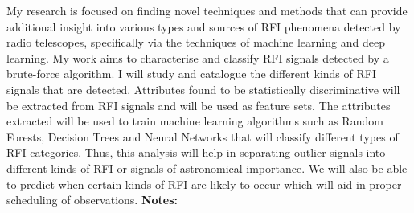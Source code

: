 \documentclass{report}
\begin{document}
{{{{{{{{{{{{{{{{{{{{{{{{{{{{{{{{{{{{{{{{{{{{{{{{{{{{{{{{{{{{{{{{{{{{{{{{{{{{{{{{{{{{{{{{{{{{{{{{{{{{{{{{{{{{{{{{{{{{{{{{{{{{{{{{{{{{{{{{{{{{{{{{{{{{{{{{{{{{{{{{{{{{{{{{{{{{{{{My research is focused on finding novel techniques and methods that can provide additional insight into various types and sources of RFI phenomena detected by radio telescopes, specifically via the techniques of machine learning and deep learning. My work aims to characterise and classify RFI signals detected by a brute-force algorithm. I will study and catalogue the different kinds of RFI signals that are detected. Attributes found to be statistically discriminative will be extracted from RFI signals and will be used as feature sets. The attributes extracted will be used to train machine learning algorithms such as Random Forests, Decision Trees and Neural Networks that will classify different types of RFI categories. Thus,
this analysis will help in separating outlier signals into different kinds of RFI or signals of astronomical importance. We will also be able to predict when certain kinds of RFI are likely to occur which will aid in proper scheduling of observations.\newline
{\bf Notes:}\newline
{\newpage
}}}}}}}}}}}}}}}}}}}}}}}}}}}}}}}}}}}}}}}}}}}}}}}}}}}}}}}}}}}}}}}}}}}}}}}}}}}}}}}}}}}}}}}}}}}}}}}}}}}}}}}}}}}}}}}}}}}}}}}}}}}}}}}}}}}}}}}}}}}}}}}}}}}}}}}}}}}}}}}}}}}}}}}}}}}}}}}}
\end{document}
